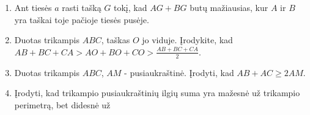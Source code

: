 \begin{enumerate}
  \item Ant tiesės $a$ rasti tašką $G$ tokį, kad $AG+BG$ butų mažiausias, kur
    $A$ ir $B$ yra taškai toje pačioje tiesės pusėje.
\item Duotas trikampis $ABC$, taškas $O$ jo viduje.
  Įrodykite, kad $AB+BC+CA>AO+BO+CO> \frac{AB+BC+CA}{2}$.
\item Duotas trikampis $ABC$, $AM$ - pusiaukraštinė. Įrodyti,
  kad $AB + AC \geq 2AM$.
\item Įrodyti, kad trikampio pusiaukraštinių ilgių suma yra
  mažesnė už trikampio perimetrą, bet didesnė už

\end{enumerate}
